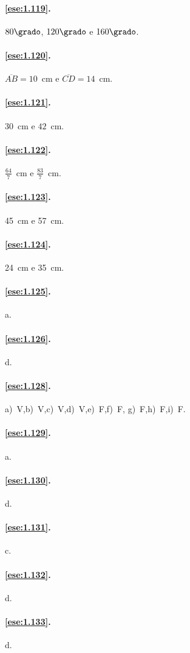 \paragraph{\ref{ese:1.119}.}
$80\grado$, $120\grado$ e $160\grado$.

\paragraph{\ref{ese:1.120}.}
$\overline{AB}=10$~cm e $\overline{CD}=14$~cm.

\paragraph{\ref{ese:1.121}.}
$30$~cm e $42$~cm.

\paragraph{\ref{ese:1.122}.}
$\frac{64}{7}$~cm e $\frac{83}{7}$~cm.

\paragraph{\ref{ese:1.123}.}
45~cm e 57~cm.

\paragraph{\ref{ese:1.124}.}
24~cm e 35~cm.

\paragraph{\ref{ese:1.125}.}
a.

\paragraph{\ref{ese:1.126}.}
d.

\paragraph{\ref{ese:1.128}.}
a)~V,\quad b)~V,\quad c)~V,\quad d)~V,\quad e)~F,\quad f)~F,\quad 
g)~F,\quad h)~F,\quad i)~F.

\paragraph{\ref{ese:1.129}.}
a.

\paragraph{\ref{ese:1.130}.}
d.

\paragraph{\ref{ese:1.131}.}
c.

\paragraph{\ref{ese:1.132}.}
d.

\paragraph{\ref{ese:1.133}.}
d.

\endgroup
